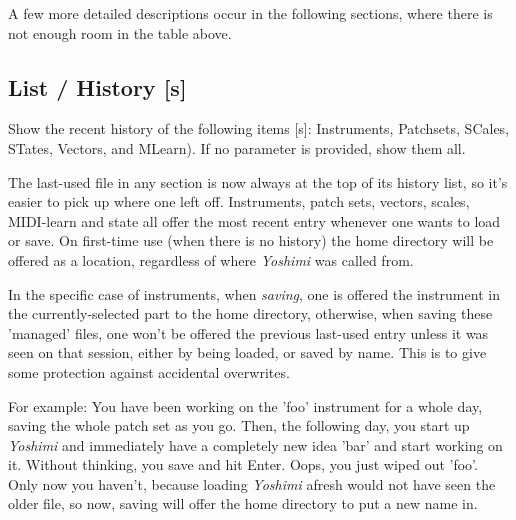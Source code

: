 
A few more detailed descriptions occur in the following sections, where there
is not enough room in the table above.

%
%
%

\subsection{List / History [s]}
\label{subsec:command_line_list_history}

   Show the recent history of the following items [s]:
   Instruments, Patchsets, SCales, STates, Vectors, and MLearn).
   If no parameter is provided, show them all.

   The last-used file in any section is now always at the top of its history list,
   so it's easier to pick up where one left off.
   Instruments, patch sets, vectors, scales, MIDI-learn and state all offer the
   most recent entry whenever one wants to load or save.  On first-time use (when
   there is no history) the home directory will be offered as a location,
   regardless of where \textsl{Yoshimi} was called from.

   In the specific case of instruments, when \textsl{saving},
   one is offered the instrument in the currently-selected part to the home
   directory, otherwise, when saving these 'managed' files,
   one won't be offered the previous last-used entry unless it was seen on that
   session, either by being loaded, or saved by name. This is to give some
   protection against accidental overwrites.

   For example:
   You have been working on the 'foo' instrument
   for a whole day, saving the whole patch set as you
   go. Then, the following day, you start up \textsl{Yoshimi}
   and immediately have a completely
   new idea 'bar' and start working on it. Without thinking, you save and hit
   Enter. Oops, you just wiped out 'foo'.
   Only now you haven't, because loading \textsl{Yoshimi}
   afresh would not have seen the older file, so now, saving
   will offer the home directory to put a new name in.

